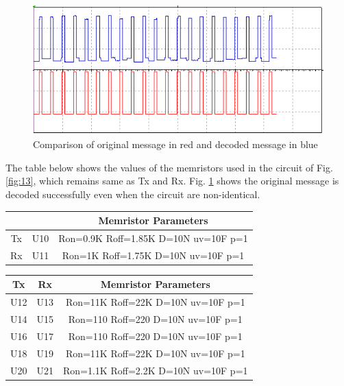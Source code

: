 \begin{figure}[!t]
    \centering
    \includegraphics[width = 0.7\linewidth]{figs/Fig20x_OSC_02.PNG}
    \caption{Comparison of original message in red and decoded message in blue}
    \label{fig:14}
\end{figure}


The table below shows the values of the memristors used in the circuit of Fig. \ref{fig:13}, which remains same as Tx and Rx. Fig. \ref{fig:14} shows the original message is decoded successfully even when the circuit are non-identical. 

\begin{center}
\small
\begin{tabular}{|c c c |} 
 \hline
  &  & Memristor Parameters \\ [0.5ex] 
 \hline\hline
 Tx  & U10 & Ron=0.9K Roff=1.85K D=10N uv=10F p=1 \\ 
 \hline
 Rx & U11 & Ron=1K Roff=1.75K D=10N uv=10F p=1 \\ 
 \hline
\end{tabular}
\end{center}

\begin{center}
\small
\begin{tabular}{|c c c |} 
 \hline
 Tx & Rx & Memristor Parameters \\ [0.5ex] 
 \hline\hline
 U12 & U13 & Ron=11K Roff=22K D=10N uv=10F p=1 \\ 
 \hline
 U14 & U15 & Ron=110 Roff=220 D=10N uv=10F p=1 \\ 
 \hline
 U16 & U17 & Ron=110 Roff=220 D=10N uv=10F p=1 \\ 
 \hline
 U18 & U19 & Ron=11K Roff=22K D=10N uv=10F p=1 \\ 
 \hline
  U20 & U21 & Ron=1.1K Roff=2.2K D=10N uv=10F p=1 \\ 
 \hline
\end{tabular}
\end{center}


